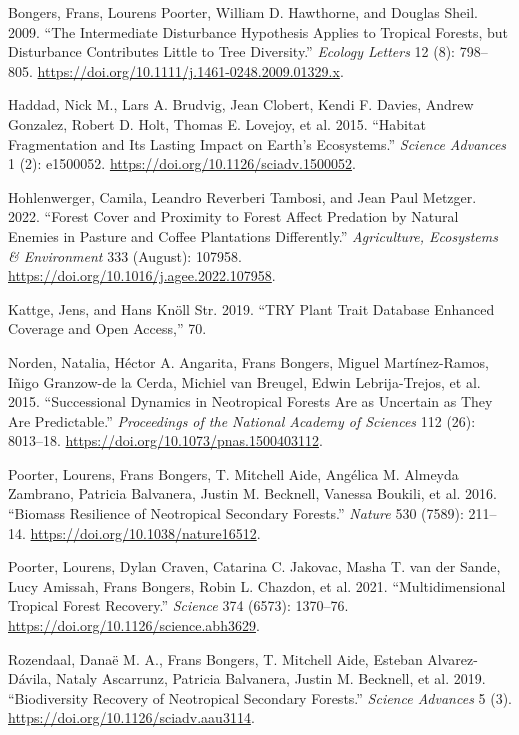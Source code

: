 \documentclass[
]{article}
\newlength{\cslhangindent}
\newlength{\cslentryspacingunit} %
\newenvironment{CSLReferences}[2] %
 {%
  \setlength{\parindent}{0pt}
  \ifodd #1
  \let\oldpar\par
  \def\par{\hangindent=\cslhangindent\oldpar}
  \fi
  \setlength{\parskip}{#2\cslentryspacingunit}
 }%
 {}
\begin{document}
\hypertarget{refs}{}
\begin{CSLReferences}{1}{0}
\leavevmode{}%
Bongers, Frans, Lourens Poorter, William D. Hawthorne, and Douglas
Sheil. 2009. {``The Intermediate Disturbance Hypothesis Applies to
Tropical Forests, but Disturbance Contributes Little to Tree
Diversity.''} \emph{Ecology Letters} 12 (8): 798--805.
\url{https://doi.org/10.1111/j.1461-0248.2009.01329.x}.

\leavevmode{}%
Haddad, Nick M., Lars A. Brudvig, Jean Clobert, Kendi F. Davies, Andrew
Gonzalez, Robert D. Holt, Thomas E. Lovejoy, et al. 2015. {``Habitat
Fragmentation and Its Lasting Impact on {Earth}'s Ecosystems.''}
\emph{Science Advances} 1 (2): e1500052.
\url{https://doi.org/10.1126/sciadv.1500052}.

\leavevmode{}%
Hohlenwerger, Camila, Leandro Reverberi Tambosi, and Jean Paul Metzger.
2022. {``Forest Cover and Proximity to Forest Affect Predation by
Natural Enemies in Pasture and Coffee Plantations Differently.''}
\emph{Agriculture, Ecosystems \& Environment} 333 (August): 107958.
\url{https://doi.org/10.1016/j.agee.2022.107958}.

\leavevmode{}%
Kattge, Jens, and Hans Knöll Str. 2019. {``{TRY} Plant Trait Database
\textendash{} Enhanced Coverage and Open Access,''} 70.

\leavevmode{}%
Norden, Natalia, Héctor A. Angarita, Frans Bongers, Miguel
Martínez-Ramos, Iñigo Granzow-de la Cerda, Michiel van Breugel, Edwin
Lebrija-Trejos, et al. 2015. {``Successional Dynamics in {Neotropical}
Forests Are as Uncertain as They Are Predictable.''} \emph{Proceedings
of the National Academy of Sciences} 112 (26): 8013--18.
\url{https://doi.org/10.1073/pnas.1500403112}.

\leavevmode{}%
Poorter, Lourens, Frans Bongers, T. Mitchell Aide, Angélica M. Almeyda
Zambrano, Patricia Balvanera, Justin M. Becknell, Vanessa Boukili, et
al. 2016. {``Biomass Resilience of {Neotropical} Secondary Forests.''}
\emph{Nature} 530 (7589): 211--14.
\url{https://doi.org/10.1038/nature16512}.

\leavevmode{}%
Poorter, Lourens, Dylan Craven, Catarina C. Jakovac, Masha T. van der
Sande, Lucy Amissah, Frans Bongers, Robin L. Chazdon, et al. 2021.
{``Multidimensional Tropical Forest Recovery.''} \emph{Science} 374
(6573): 1370--76. \url{https://doi.org/10.1126/science.abh3629}.

\leavevmode{}%
Rozendaal, Danaë M. A., Frans Bongers, T. Mitchell Aide, Esteban
Alvarez-Dávila, Nataly Ascarrunz, Patricia Balvanera, Justin M.
Becknell, et al. 2019. {``Biodiversity Recovery of {Neotropical}
Secondary Forests.''} \emph{Science Advances} 5 (3).
\url{https://doi.org/10.1126/sciadv.aau3114}.

\end{CSLReferences}
\end{document}
